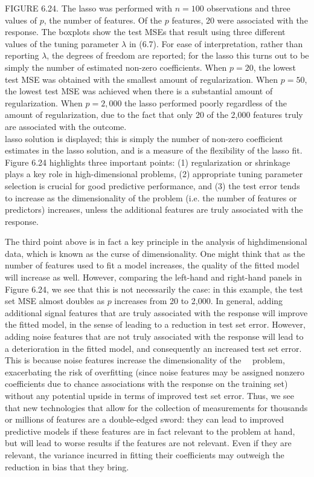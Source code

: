 \documentclass[10pt]{article}
\begin{document}
FIGURE 6.24. The lasso was performed with $n=100$ observations and three values of $p$, the number of features. Of the $p$ features, 20 were associated with the response. The boxplots show the test MSEs that result using three different values of the tuning parameter $\lambda$ in (6.7). For ease of interpretation, rather than reporting $\lambda$, the degrees of freedom are reported; for the lasso this turns out to be simply the number of estimated non-zero coefficients. When $p=20$, the lowest test MSE was obtained with the smallest amount of regularization. When $p=50$, the lowest test MSE was achieved when there is a substantial amount of regularization. When $p=2,000$ the lasso performed poorly regardless of the amount of regularization, due to the fact that only 20 of the 2,000 features truly are associated with the outcome.\\
lasso solution is displayed; this is simply the number of non-zero coefficient estimates in the lasso solution, and is a measure of the flexibility of the lasso fit. Figure 6.24 highlights three important points: (1) regularization or shrinkage plays a key role in high-dimensional problems, (2) appropriate tuning parameter selection is crucial for good predictive performance, and (3) the test error tends to increase as the dimensionality of the problem (i.e. the number of features or predictors) increases, unless the additional features are truly associated with the response.

The third point above is in fact a key principle in the analysis of highdimensional data, which is known as the curse of dimensionality. One might think that as the number of features used to fit a model increases, the quality of the fitted model will increase as well. However, comparing the left-hand and right-hand panels in Figure 6.24, we see that this is not necessarily the case: in this example, the test set MSE almost doubles as $p$ increases from 20 to 2,000. In general, adding additional signal features that are truly associated with the response will improve the fitted model, in the sense of leading to a reduction in test set error. However, adding noise features that are not truly associated with the response will lead to a deterioration in the fitted model, and consequently an increased test set error. This is because noise features increase the dimensionality of the\
\
problem, exacerbating the risk of overfitting (since noise features may be assigned nonzero coefficients due to chance associations with the response on the training set) without any potential upside in terms of improved test set error. Thus, we see that new technologies that allow for the collection of measurements for thousands or millions of features are a double-edged sword: they can lead to improved predictive models if these features are in fact relevant to the problem at hand, but will lead to worse results if the features are not relevant. Even if they are relevant, the variance incurred in fitting their coefficients may outweigh the reduction in bias that they bring.
\end{document}
